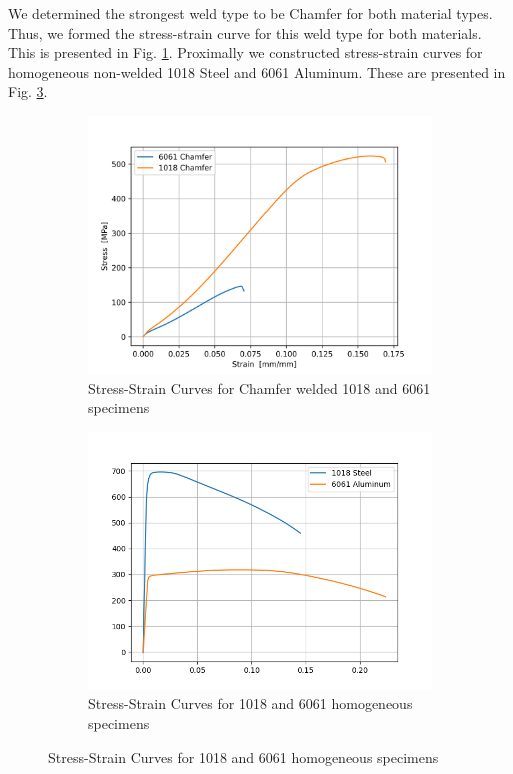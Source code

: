 \documentclass{article}
\begin{document}
We determined the strongest weld type to be Chamfer for both material types. Thus, we formed the stress-strain curve for this weld type for both materials. This is presented in Fig. \ref{fig:q2weld}. Proximally we constructed stress-strain curves for homogeneous non-welded 1018 Steel and 6061 Aluminum. These are presented in Fig. \ref{fig:q2norm}.
\begin{figure}[!hp!]
\begin{subfigure}{.5\textwidth}
    \centering
    \includegraphics[width=\linewidth]{plots/q2weld.png}
    \caption{Stress-Strain Curves for Chamfer welded 1018 \newline \quad and 6061 specimens}
    \label{fig:q2weld}
\end{subfigure}
\begin{subfigure}{.5\textwidth}
    \centering
    \includegraphics[width=\linewidth]{plots/q2norm.png}
    \caption{Stress-Strain Curves for 1018 and 6061  \newline \quad homogeneous specimens}
    \label{fig:q2norm}
\end{subfigure}
\end{figure}
\end{document}
